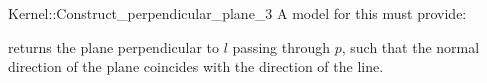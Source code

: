 \begin{ccRefFunctionObjectConcept}{Kernel::Construct_perpendicular_plane_3}
A model for this must provide:


{returns the plane perpendicular to $l$ passing through $p$,
such that the normal direction of the plane coincides with the direction of
the line.}

\ccIsModel{}

\end{ccRefFunctionObjectConcept}
